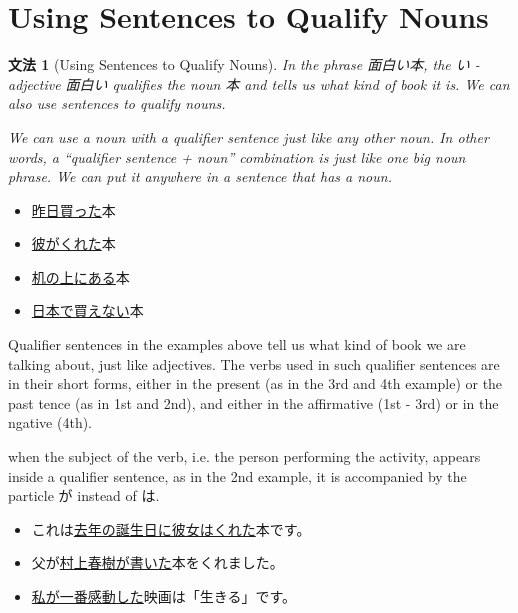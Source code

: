 \documentclass[notoc,notitlepage]{tufte-book}
\newtheorem{grammar}{\faBook \enspace 文法}[section]
\begin{document}

\section{Using Sentences to Qualify Nouns}%
\label{sec:using_sentences_to_qualify_nouns}

\begin{grammar}[Using Sentences to Qualify Nouns]
\label{grammar:using_sentences_to_qualify_nouns}
  In the phrase 面白い本, the い -adjective 面白い qualifies the noun 本 and tells us what kind of book it is. We can also use sentences to qualify nouns.

  We can use a noun with a qualifier sentence just like any other noun. In other words, a ``qualifier sentence + noun'' combination is just like one big noun phrase. We can put it anywhere in a sentence that has a noun.
\end{grammar}

\begin{eg}
  \begin{itemize}
    \item \underline{昨日買った}本
    \item \underline{彼がくれた}本
    \item \underline{机の上にある}本
    \item \underline{日本で買えない}本
  \end{itemize}
\end{eg}

\begin{note}
  Qualifier sentences in the examples above tell us what kind of book we are talking about, just like adjectives. The verbs used in such qualifier sentences are in their short forms, either in the present (as in the 3rd and 4th example) or the past tence (as in 1st and 2nd), and either in the affirmative (1st - 3rd) or in the ngative (4th).

   when the subject of the verb, i.e. the person performing the activity, appears inside a qualifier sentence, as in the 2nd example, it is accompanied by the particle が instead of は.
\end{note}

\begin{eg}
  \begin{itemize}
    \item これは\underline{去年の誕生日に彼女はくれた}本です。
    \item 父が\underline{村上春樹が書いた}本をくれました。
    \item \underline{私が一番感動した}映画は「生きる」です。
  \end{itemize}
\end{eg}
\end{document}

